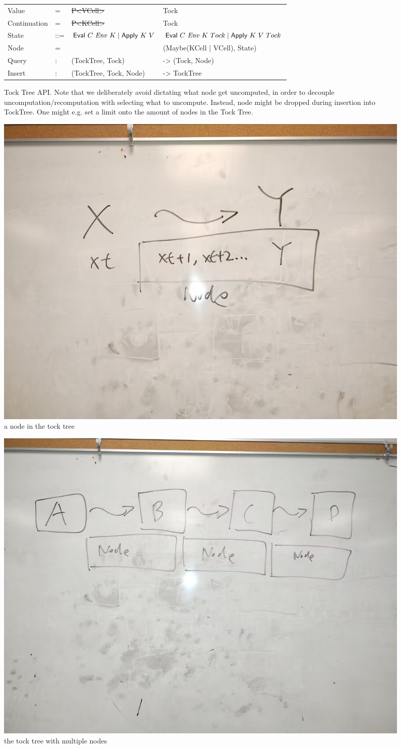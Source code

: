 \begin{figure}
	\begin{tabular}{p{5em} p{3em} p{10em} p{}}
		Value & = & \st{P<VCell>} & Tock \\
		Continuation & = & \st{P<KCell>} & Tock \\
		State & ::= & \st{$\text{\textsf{Eval}}~C~\mathit{Env}~K \mid \text{\textsf{Apply}}~K~V $} & $\text{\textsf{Eval}}~C~\mathit{Env}~K~Tock \mid \text{\textsf{Apply}}~K~V~Tock $ \\
		Node & = & & (Maybe(KCell | VCell), State) \\
		Query & $:$ & (TockTree, Tock) & -> (Tock, Node) \\
		Insert & $:$ & (TockTree, Tock, Node) & -> TockTree \\
	\end{tabular}
	\caption{Tock Tree API. Note that we deliberately avoid dictating what node get uncomputed, in order to decouple uncomputation/recomputation with selecting what to uncompute. Instead, node might be dropped during insertion into TockTree. One might e.g. set a limit onto the amount of nodes in the Tock Tree. }
\end{figure}
\begin{figure}
	\includegraphics[width=0.5\columnwidth]{img2}
	\caption{a node in the tock tree}
\end{figure}
\begin{figure}
	\includegraphics[width=0.5\columnwidth]{img3}
	\caption{the tock tree with multiple nodes}
\end{figure}

